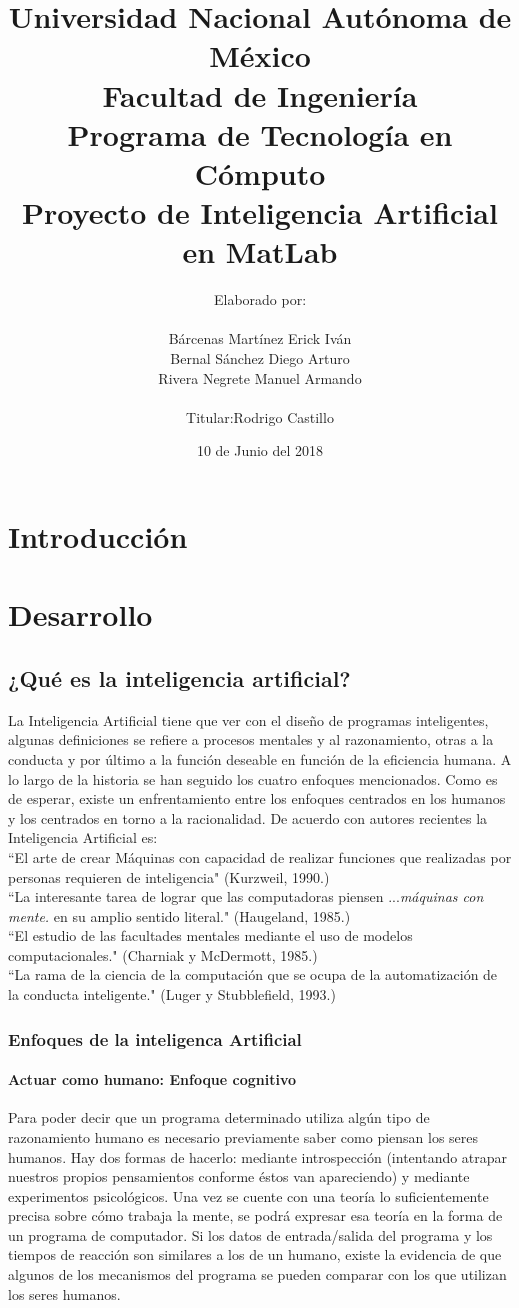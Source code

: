 \documentclass[12pt,a4paper]{report}
\author{Elaborado por:\\\\Bárcenas Martínez Erick Iván \\ Bernal Sánchez Diego Arturo \\ Rivera Negrete Manuel Armando\\\\Titular:Rodrigo Castillo}
\date{10 de Junio del 2018}
\title{Universidad Nacional Autónoma de México\\Facultad de Ingeniería\\Programa de Tecnología en Cómputo\\Proyecto de Inteligencia Artificial en MatLab}
\begin{document}
\maketitle
\part{Introducción}
\part{Desarrollo}
\chapter{¿Qué es la inteligencia artificial?}
La Inteligencia Artificial tiene que ver con el diseño de  programas inteligentes, algunas definiciones se refiere a procesos mentales y al razonamiento, otras a la conducta y por último a la  función deseable en función de la eficiencia humana. A lo largo de la historia se han seguido los cuatro enfoques mencionados. Como es
de esperar, existe un enfrentamiento entre los enfoques centrados en los humanos y los
centrados en torno a la racionalidad. De acuerdo con autores recientes la Inteligencia Artificial es: \\``El arte de crear Máquinas con capacidad de realizar funciones que realizadas por personas requieren de inteligencia" (Kurzweil, 1990.)\\``La interesante tarea de lograr que las computadoras piensen ...\textit{máquinas con mente.} en su amplio sentido literal." (Haugeland, 1985.)\\``El estudio de las facultades mentales mediante el uso de modelos computacionales." (Charniak y McDermott, 1985.)\\``La rama de la ciencia de la computación que se ocupa de la automatización de la conducta inteligente." (Luger y Stubblefield, 1993.)
\section{Enfoques de la inteligenca Artificial}
\subsection*{Actuar como humano: Enfoque cognitivo}
Para poder decir que un programa determinado utiliza algún tipo de razonamiento humano es necesario previamente saber como piensan los seres humanos. Hay dos formas de hacerlo: mediante introspección (intentando atrapar nuestros propios pensamientos conforme éstos van apareciendo) y mediante experimentos psicológicos. Una vez se cuente con una teoría lo
suficientemente precisa sobre cómo trabaja la mente, se podrá expresar esa teoría en la
forma de un programa de computador. Si los datos de entrada/salida del programa y los
tiempos de reacción son similares a los de un humano, existe la evidencia de que algunos de los mecanismos del programa se pueden comparar con los que utilizan los seres
humanos.
\end{document}

